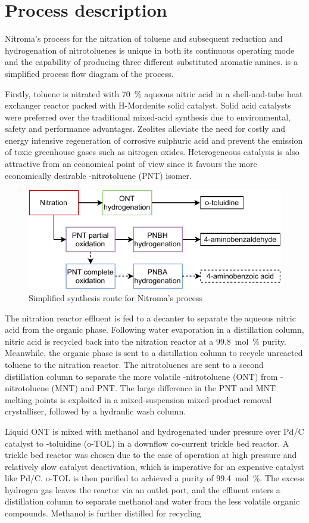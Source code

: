 \section*{Process description}

Nitroma's process for the nitration of toluene and subsequent reduction and hydrogenation of nitrotoluenes is unique in both its continuous operating mode and the capability of producing three different substituted aromatic amines.   is a simplified process flow diagram of the process.

Firstly, toluene is nitrated with \SI{70}{\percent} aqueous nitric acid in a shell-and-tube heat exchanger reactor packed with H-Mordenite solid catalyst. Solid acid catalysts were preferred over the traditional mixed-acid synthesis due to environmental, safety and performance advantages. Zeolites alleviate the need for costly and energy intensive regeneration of corrosive sulphuric acid and prevent the emission of toxic greenhouse gases such as nitrogen oxides. Heterogeneous catalysis is also attractive from an economical point of view since it favours the more economically desirable \para-nitrotoluene (PNT) isomer. 

\begin{figure}
    \centering
    \includegraphics[width=0.4\linewidth]{chapters/0-executive-summary/figures/BFD_nitroma-simplifed.pdf}
    \caption{Simplified synthesis route for Nitroma's process}
    \label{fig:BFD-ES}
\end{figure}
The nitration reactor effluent is fed to a decanter to separate the aqueous nitric acid from the organic phase. Following water evaporation in a distillation column, nitric acid is recycled back into the nitration reactor at a \SI{99.8}{mol\percent} purity. Meanwhile, the organic phase is sent to a distillation column to recycle unreacted toluene to the nitration reactor. The nitrotoluenes are sent to a second distillation column to separate the more volatile \ortho-nitrotoluene (ONT) from \meta-nitrotoluene (MNT) and PNT. The large difference in the PNT and MNT melting points is exploited in a mixed-suspension mixed-product removal crystalliser, followed by a hydraulic wash column.

Liquid ONT is mixed with methanol and hydrogenated under pressure over Pd/C catalyst to \ortho-toluidine (o-TOL) in a downflow co-current trickle bed reactor. A trickle bed reactor was chosen due to the ease of operation at high pressure and relatively slow catalyst deactivation, which is imperative for an expensive catalyst like Pd/C. o-TOL is then purified to achieved a purity of \SI{99.4}{mol\percent}. The excess hydrogen gas leaves the reactor via an outlet port, and the effluent enters a distillation column to separate methanol and water from the less volatile organic compounds. Methanol is further distilled for recycling

